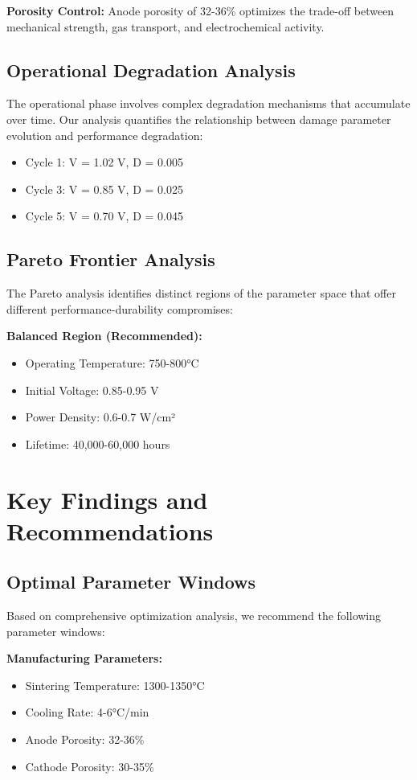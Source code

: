 \documentclass[11pt,a4paper]{article}
\begin{document}
\textbf{Porosity Control:} Anode porosity of 32-36\% optimizes the trade-off between mechanical strength, gas transport, and electrochemical activity.

\subsection{Operational Degradation Analysis}

The operational phase involves complex degradation mechanisms that accumulate over time. Our analysis quantifies the relationship between damage parameter evolution and performance degradation:

\begin{itemize}
\item Cycle 1: V = 1.02 V, D = 0.005
\item Cycle 3: V = 0.85 V, D = 0.025
\item Cycle 5: V = 0.70 V, D = 0.045
\end{itemize}

\subsection{Pareto Frontier Analysis}

The Pareto analysis identifies distinct regions of the parameter space that offer different performance-durability compromises:

\textbf{Balanced Region (Recommended):}
\begin{itemize}
\item Operating Temperature: 750-800°C
\item Initial Voltage: 0.85-0.95 V
\item Power Density: 0.6-0.7 W/cm²
\item Lifetime: 40,000-60,000 hours
\end{itemize}

\section{Key Findings and Recommendations}

\subsection{Optimal Parameter Windows}

Based on comprehensive optimization analysis, we recommend the following parameter windows:

\textbf{Manufacturing Parameters:}
\begin{itemize}
\item Sintering Temperature: 1300-1350°C
\item Cooling Rate: 4-6°C/min
\item Anode Porosity: 32-36\%
\item Cathode Porosity: 30-35\%
\end{itemize}
\end{document}
